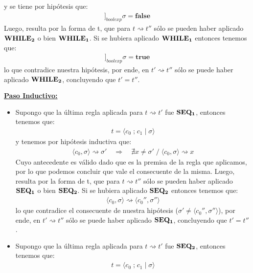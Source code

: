 \documentclass[a4paper,10pt]{article}
\begin{document}
\begin{itemize}
			y se tiene por hipótesis que:
				\begin{align*} [\![b]\!]_{boolexp}\sigma = \textbf{false} \end{align*}
			Luego, resulta por la forma de t, que para $t \rightsquigarrow t''$ sólo se pueden haber aplicado ${\bf WHILE_{2}}$ o bien ${\bf WHILE_{1}}$.
			Si se hubiera aplicado ${\bf WHILE_{1}}$ entonces tenemos que:
				\begin{align*} [\![b]\!]_{boolexp}\sigma = \textbf{true} \end{align*}
			lo que contradice nuestra hipótesis, por ende, en $t' \rightsquigarrow t''$ sólo se puede haber aplicado ${\bf WHILE_{2}}$, concluyendo que $t'= t''$.
			\\
	\end{itemize}
	\underline{\bf Paso Inductivo:}
	\begin{itemize}
		\item Supongo que la última regla aplicada para $t \rightsquigarrow t'$ fue ${\bf SEQ_{1}}$, entonces tenemos que:
				\begin{align*} t = \langle c_{0} \;\textbf{;}\; c_{1} \;|\; \sigma\rangle \end{align*}
			y tenemos por hipótesis inductiva que:
				\begin{align*} \langle c_{0},\sigma\rangle \rightsquigarrow \sigma' \quad \Rightarrow \quad \nexists x \neq \sigma' \;{\big /}\; \langle c_{0},\sigma\rangle \rightsquigarrow x \end{align*}
			Cuyo antecedente es válido dado que es la premisa de la regla que aplicamos, por lo que podemos concluir que vale el consecuente de la misma. Luego, resulta por la forma de t, que para $t \rightsquigarrow t''$ sólo se pueden haber aplicado ${\bf SEQ_{1}}$ o bien ${\bf SEQ_{2}}$.
			Si se hubiera aplicado ${\bf SEQ_{2}}$ entonces tenemos que:
				\begin{align*} \langle c_{0},\sigma\rangle \rightsquigarrow \langle c_{0}'',\sigma'' \rangle \end{align*}
			lo que contradice el consecuente de nuestra hipótesis ($\sigma' \neq \langle c_{0}'',\sigma'' \rangle$), por ende, en $t' \rightsquigarrow t''$ sólo se puede haber aplicado ${\bf SEQ_{1}}$, concluyendo que $t'= t''$.
			\\
			\item Supongo que la última regla aplicada para $t \rightsquigarrow t'$ fue ${\bf SEQ_{2}}$, entonces tenemos que:
				\begin{align*} t = \langle c_{0} \;\textbf{;}\; c_{1} \;|\; \sigma\rangle \end{align*}

\end{itemize}
\end{document}
